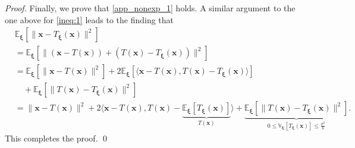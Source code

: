 \documentclass[10pt,a4paper]{amsart}
\begin{document}
\begin{proof}
Finally, we prove that \eqref{app_nonexp_1} holds. A similar argument to the one above for \eqref{ineq:1} leads to the finding that 
\begin{align*}
&\mathbb{E}_{\bm{\xi}} \left[ \| \bm{x} - T_{\bm{\xi}}(\bm{x}) \|^2 \right]\\
&= 
\mathbb{E}_{\bm{\xi}} \left[ \| (\bm{x} - T(\bm{x})) 
+ (T(\bm{x}) - T_{\bm{\xi}} (\bm{x})) \|^2 \right]\\
&=
\mathbb{E}_{\bm{\xi}} \left[ \| \bm{x} - T(\bm{x}) \|^2 \right]
+ 2 \mathbb{E}_{\bm{\xi}} \left[ \langle \bm{x} - T(\bm{x}), T(\bm{x}) - T_{\bm{\xi}} (\bm{x}) \rangle \right]\\
&\quad + 
\mathbb{E}_{\bm{\xi}} \left[ \| T(\bm{x}) - T_{\bm{\xi}} (\bm{x})  \|^2 \right]\\
&=
\| \bm{x} - T(\bm{x}) \|^2
+ 2  \langle \bm{x} - T(\bm{x}), T(\bm{x}) - \underbrace{\mathbb{E}_{\bm{\xi}} \left[T_{\bm{\xi}} (\bm{x}) \right]}_{T(\bm{x})} \rangle 
+ 
\underbrace{\mathbb{E}_{\bm{\xi}} \left[ \| T(\bm{x}) - T_{\bm{\xi}} (\bm{x})  \|^2 \right]}_{0 \leq \mathbb{V}_{\bm{\xi}}[T_{\bm{\xi}} (\bm{x})] \leq \frac{\sigma^2}{b}}.
\end{align*}
This completes the proof.
\qed
\end{proof}
\end{document}
